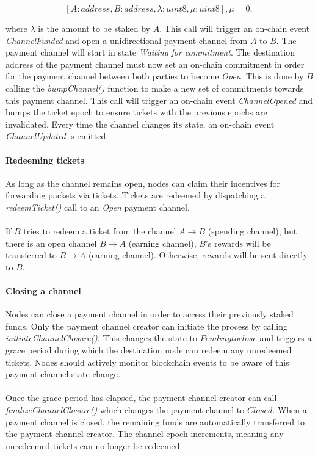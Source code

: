 $$[A: address, B: address, \lambda: uint8, \mu: uint8], \mu = 0,$$

where $\lambda$ is the amount to be staked by $A$. This call will trigger an on-chain event \textit{ChannelFunded}
and open a unidirectional payment channel from $A$ to $B$. The payment channel will start
in state \textit{Waiting for commitment}. The destination address of the
payment channel must now set an on-chain commitment in order for the payment
channel between both parties to become \textit{Open}. This is done by $B$
calling the \textit{bumpChannel()} function to make a new set of commitments
towards this payment channel. This call will trigger an on-chain event
\textit{ChannelOpened} and bumps the ticket epoch to ensure tickets with the
previous epochs are invalidated. Every time the channel changes its state, an on-chain event \textit{ChannelUpdated} is emitted.

\paragraph{Redeeming tickets}
As long as the channel remains open, nodes can claim their incentives for
forwarding packets via tickets. Tickets are redeemed by dispatching a
\textit{redeemTicket()} call to an \textit{Open} payment channel.
\\~\\If $B$ tries to redeem a ticket from the channel $A\rightarrow B$ (spending
channel), but there is an open channel $B\rightarrow A$ (earning channel),
$B$'s rewards will be transferred to $B\rightarrow A$ (earning channel).
Otherwise, rewards will be sent directly to $B$.

\paragraph{Closing a channel}
Nodes can close a payment channel in order to access their previously staked
funds. Only the payment channel creator can initiate the process by calling
\textit{initiateChannelClosure()}. This changes the state to $Pending to close$
and triggers a grace period during which the destination node can redeem
any unredeemed tickets. Nodes should actively monitor blockchain events to
be aware of this payment channel state change.
\\~\\Once the grace period has elapsed, the payment channel creator can call
\textit{finalizeChannelClosure()} which changes the payment channel to
$Closed$. When a payment channel is closed, the remaining funds are automatically transferred
to the payment channel creator. The channel epoch increments, meaning any unredeemed tickets can no longer be redeemed.

